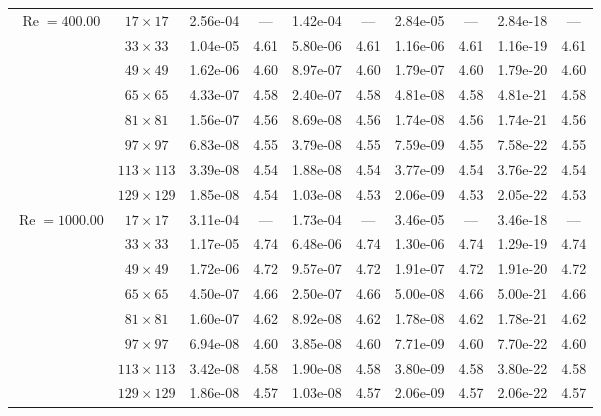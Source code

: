 \documentclass[preprint, 12pt]{elsarticle}
\begin{document}
\begin{center}
\begin{table}[H]
{\begin{tabular*}{\textwidth}{@{\extracolsep\fill}cccccccccc@{}}
    \hline
    \multirow{7}{*}{$\operatorname{Re}=400.00$} & $17\times 17$ & 2.56e-04 & --- & 1.42e-04 & --- & 2.84e-05 & --- & 2.84e-18 & --- \\
    & $33\times 33$ & 1.04e-05 & 4.61 & 5.80e-06 & 4.61 & 1.16e-06 & 4.61 & 1.16e-19 & 4.61 \\
    & $49\times 49$ & 1.62e-06 & 4.60 & 8.97e-07 & 4.60 & 1.79e-07 & 4.60 & 1.79e-20 & 4.60 \\
    \multirow{3}{*}{$\operatorname{Wi}=10$} & $65\times 65$ & 4.33e-07 & 4.58 & 2.40e-07 & 4.58 & 4.81e-08 & 4.58 & 4.81e-21 & 4.58 \\
    & $81\times 81$ & 1.56e-07 & 4.56 & 8.69e-08 & 4.56 & 1.74e-08 & 4.56 & 1.74e-21 & 4.56 \\
    & $97\times 97$ & 6.83e-08 & 4.55 & 3.79e-08 & 4.55 & 7.59e-09 & 4.55 & 7.58e-22 & 4.55 \\
    & $113\times 113$ & 3.39e-08 & 4.54 & 1.88e-08 & 4.54 & 3.77e-09 & 4.54 & 3.76e-22 & 4.54 \\
    & $129\times 129$ & 1.85e-08 & 4.54 & 1.03e-08 & 4.53 & 2.06e-09 & 4.53 & 2.05e-22 & 4.53 \\
    \hline
    \multirow{7}{*}{$\operatorname{Re}=1000.00$} & $17\times 17$ & 3.11e-04 & --- & 1.73e-04 & --- & 3.46e-05 & --- & 3.46e-18 & --- \\
    & $33\times 33$ & 1.17e-05 & 4.74 & 6.48e-06 & 4.74 & 1.30e-06 & 4.74 & 1.29e-19 & 4.74 \\
    & $49\times 49$ & 1.72e-06 & 4.72 & 9.57e-07 & 4.72 & 1.91e-07 & 4.72 & 1.91e-20 & 4.72 \\
    \multirow{3}{*}{$\operatorname{Wi}=10$} & $65\times 65$ & 4.50e-07 & 4.66 & 2.50e-07 & 4.66 & 5.00e-08 & 4.66 & 5.00e-21 & 4.66 \\
    & $81\times 81$ & 1.60e-07 & 4.62 & 8.92e-08 & 4.62 & 1.78e-08 & 4.62 & 1.78e-21 & 4.62 \\
    & $97\times 97$ & 6.94e-08 & 4.60 & 3.85e-08 & 4.60 & 7.71e-09 & 4.60 & 7.70e-22 & 4.60 \\
    & $113\times 113$ & 3.42e-08 & 4.58 & 1.90e-08 & 4.58 & 3.80e-09 & 4.58 & 3.80e-22 & 4.58 \\
    & $129\times 129$ & 1.86e-08 & 4.57 & 1.03e-08 & 4.57 & 2.06e-09 & 4.57 & 2.06e-22 & 4.57 \\
    \hline
    \end{tabular*}
}
\end{table}
\end{center}

\end{document}
